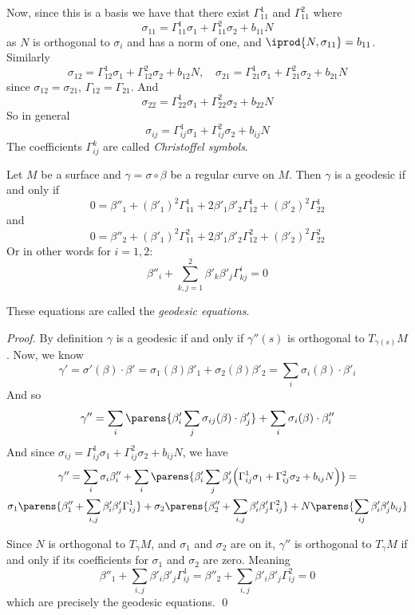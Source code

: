 Now, since this is a basis we have that there exist $\Gamma_{11}^1$ and $\Gamma_{11}^2$ where
\[ \sigma_{11} = \Gamma_{11}^1\sigma_1 + \Gamma_{11}^2\sigma_2 + b_{11}N \]
as $N$ is orthogonal to $\sigma_i$ and has a norm of one, and $\iprod{N,\sigma_{11}}=b_{11}$.
Similarly
\[ \sigma_{12} = \Gamma_{12}^1\sigma_1 + \Gamma_{12}^2\sigma_2 + b_{12}N,\quad \sigma_{21} = \Gamma_{21}^1\sigma_1 + \Gamma_{21}^2\sigma_2 + b_{21}N \]
since $\sigma_{12}=\sigma_{21}$, $\Gamma_{12}=\Gamma_{21}$.
And
\[ \sigma_{22} = \Gamma_{22}^1\sigma_1 + \Gamma_{22}^2\sigma_2 + b_{22}N \]
So in general
\[ \sigma_{ij} = \Gamma_{ij}^1\sigma_1 + \Gamma_{ij}^2\sigma_2 + b_{ij}N \]
The coefficients $\Gamma_{ij}^k$ are called \emph{Christoffel symbols}.

\begin{thrm*}

    Let $M$ be a surface and $\gamma=\sigma\circ\beta$ be a regular curve on $M$.
    Then $\gamma$ is a geodesic if and only if
    \[ 0 = \beta''_1 + (\beta'_1)^2\Gamma_{11}^1 + 2\beta'_1\beta'_2\Gamma_{12}^1 + (\beta'_2)^2\Gamma_{22}^1 \]
    and
    \[ 0 = \beta''_2 + (\beta'_1)^2\Gamma_{11}^2 + 2\beta'_1\beta'_2\Gamma_{12}^2 + (\beta'_2)^2\Gamma_{22}^2 \]
    Or in other words for $i=1,2$:
    \[ \beta''_i + \sum_{k,j=1}^2 \beta'_k\beta'_j\Gamma_{kj}^i = 0 \]

\end{thrm*}

These equations are called the \emph{geodesic equations}.

\begin{proof}

    By definition $\gamma$ is a geodesic if and only if $\gamma''(s)$ is orthogonal to $T_{\gamma(s)}M$.
    Now, we know
    \[ \gamma' = \sigma'(\beta)\cdot\beta' = \sigma_1(\beta)\beta'_1 + \sigma_2(\beta)\beta'_2 = \sum_i \sigma_i(\beta)\cdot\beta'_i \]
    And so
    \[ \gamma'' = \sum_i\parens{\beta'_i\sum_j \sigma_{ij}(\beta)\cdot\beta'_j} + \sum_i\sigma_i(\beta)\cdot\beta''_i \]
    And since $\sigma_{ij} = \Gamma_{ij}^1\sigma_1 + \Gamma_{ij}^2\sigma_2 + b_{ij}N$, we have
    \begin{multline*}
        \gamma'' = \sum_i\sigma_i\beta''_i + \sum_i\parens{\beta'_i\sum_j \beta'_j\Bigl(\Gamma_{ij}^1\sigma_1 + \Gamma_{ij}^2\sigma_2 + b_{ij}N\Bigr)} =\\
        \sigma_1\parens{\beta''_1 + \sum_{i,j} \beta'_i\beta'_j\Gamma_{ij}^1} + \sigma_2\parens{\beta''_2 + \sum_{i,j} \beta'_i\beta'_j\Gamma_{ij}^2} + N\parens{\sum_{ij}\beta'_i\beta'_j b_{ij}}
    \end{multline*}

    Since $N$ is orthogonal to $T_{\gamma}M$, and $\sigma_1$ and $\sigma_2$ are on it, $\gamma''$ is orthogonal to $T_\gamma M$ if and only if its coefficients for $\sigma_1$ and $\sigma_2$ are zero.
    Meaning
    \[ {\beta''_1 + \sum_{i,j} \beta'_i\beta'_j\Gamma_{ij}^1} = {\beta''_2 + \sum_{i,j} \beta'_i\beta'_j\Gamma_{ij}^2} = 0 \]
    which are precisely the geodesic equations.
    \qed

\end{proof}

